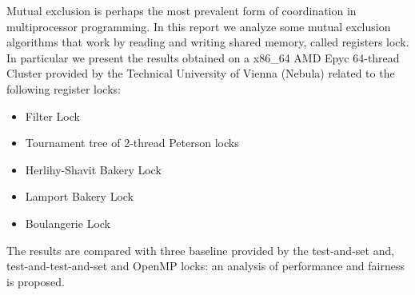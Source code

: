 Mutual exclusion is perhaps the most prevalent form of coordination in multiprocessor programming. In this report we analyze some mutual exclusion algorithms that work by reading and writing shared memory, called registers lock. In particular we present the results obtained on a x86\_64 AMD Epyc 64-thread Cluster provided by the Technical University of Vienna (Nebula) related to the following register locks:

\begin{itemize}
	\item Filter Lock
	\item Tournament tree of 2-thread Peterson locks
	\item Herlihy-Shavit Bakery Lock
	\item Lamport Bakery Lock
	\item Boulangerie Lock
\end{itemize}

The results are compared with three baseline provided by the test-and-set and, test-and-test-and-set and OpenMP locks: an analysis of performance and fairness is proposed.


\begin{comment}
	TODO:
	Challenge: Memory behavior. Ensure that memory (register)
	updates become visible in required order! Explain what happens if
	not (Peterson).
\end{comment}

